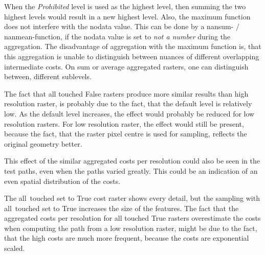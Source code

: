 When the \textit{Prohibited} level is used as the highest level, then summing the two highest levels would result in a new highest level. 
Also, the maximum function does not interfere with the nodata value. 
This can be done by a nansum- / nanmean-function, if the nodata value is set to \textit{not a number} during the aggregation.
The disadvantage of aggregation with the maximum function is, that this aggregation is unable to distinguish between nuances of different overlapping intermediate costs.
On sum or average aggregated rasters, one can distinguish between, different sublevels.

The fact that all touched False rasters produce more similar results than high resolution raster, is probably due to the fact, that the default level is relatively low.
As the default level increases, the effect would probably be reduced for low resolution rasters.
For low resolution raster, the effect would still be present, because the fact, that the raster pixel centre is used for sampling, reflects the original geometry better.

This effect of the similar aggregated costs per resolution could also be seen in the test paths, even when the paths varied greatly.
This could be an indication of an even spatial distribution of the costs.

The all~touched set to True cost raster shows every detail, but the sampling with all~touched set to True increases the size of the features.
The fact that the aggregated costs per resolution for all touched True rasters overestimate the costs when computing the path from a low resolution raster, might be due to the fact, that the high costs are much more frequent, because the costs are exponential scaled.

